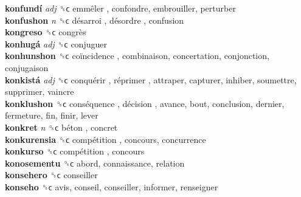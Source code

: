 \textbf{konfundí} \emph{adj}  ␝ϲ   emmêler , confondre, embrouiller, perturber  \\
\textbf{konfushon} \emph{n}  ␝ϲ   désarroi ,  désordre , confusion  \\
\textbf{kongreso} ␝ϲ   congrès   \\
\textbf{konhugá} \emph{adj}  ␝ϲ  conjuguer  \\
\textbf{konhunshon} ␝ϲ   coïncidence , combinaison, concertation, conjonction, conjugaison  \\
\textbf{konkistá} \emph{adj}  ␝ϲ   conquérir ,  réprimer , attraper, capturer, inhiber, soumettre, supprimer, vaincre  \\
\textbf{konklushon} ␝ϲ   conséquence ,  décision , avance, bout, conclusion, dernier, fermeture, fin, finir, lever  \\
\textbf{konkret} \emph{n}  ␝ϲ   béton , concret  \\
\textbf{konkurensia} ␝ϲ   compétition , concours, concurrence  \\
\textbf{konkurso} ␝ϲ   compétition , concours  \\
\textbf{konosementu} ␝ϲ  abord, connaissance, relation  \\
\textbf{konsehero} ␝ϲ  conseiller  \\
\textbf{konseho} ␝ϲ  avis, conseil, conseiller, informer, renseigner  \\
